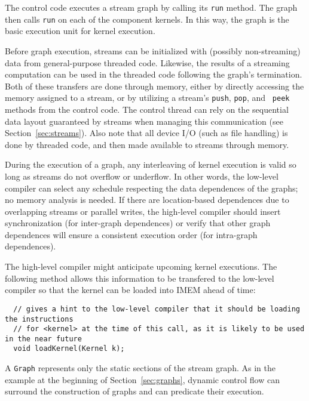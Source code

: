 
The control code executes a stream graph by calling its {\tt run}
method.  The graph then calls {\tt run} on each of the component
kernels.  In this way, the graph is the basic execution unit for
kernel execution.

Before graph execution, streams can be initialized with (possibly
non-streaming) data from general-purpose threaded code.  Likewise, the
results of a streaming computation can be used in the threaded code
following the graph's termination.  Both of these transfers are done
through memory, either by directly accessing the memory assigned to a
stream, or by utilizing a stream's {\tt push}, {\tt pop}, and {\tt
peek} methods from the control code.  The control thread can rely on
the sequential data layout guaranteed by streams when managing this
communication (see Section~\ref{sec:streams}).  Also note that all
device I/O (such as file handling) is done by threaded code, and then
made available to streams through memory.

During the execution of a graph, any interleaving of kernel execution
is valid so long as streams do not overflow or underflow.  In other
words, the low-level compiler can select any schedule respecting the
data dependences of the graphs; no memory analysis is needed.  If
there are location-based dependences due to overlapping streams or
parallel writes, the high-level compiler should insert synchronization
(for inter-graph dependences) or verify that other graph dependences
will ensure a consistent execution order (for intra-graph
dependences).

The high-level compiler might anticipate upcoming kernel executions.
The following method allows this information to be transfered to the
low-level compiler so that the kernel can be loaded into IMEM ahead of
time:
\begin{verbatim}
  // gives a hint to the low-level compiler that it should be loading the instructions 
  // for <kernel> at the time of this call, as it is likely to be used in the near future
  void loadKernel(Kernel k);
\end{verbatim}


A {\tt Graph} represents only the static sections of the stream graph.
As in the example at the beginning of Section~\ref{sec:graphs},
dynamic control flow can surround the construction of graphs and can
predicate their execution.

